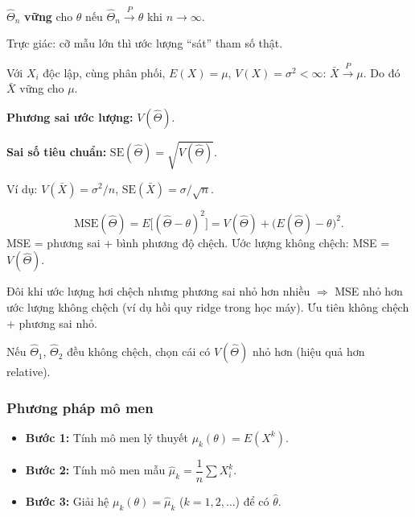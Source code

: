 \documentclass[12pt,a4paper]{article}
\begin{document}
\begin{dinhnghia}[title={Ước lượng vững}]
  $\hat{\Theta}_n$ \textbf{vững} cho $\theta$ nếu $\hat{\Theta}_n \xrightarrow{P} \theta$ khi $n \to \infty$.
  
  Trực giác: cỡ mẫu lớn thì ước lượng ``sát'' tham số thật.
\end{dinhnghia}

\begin{tinhchat}[title={Vững của trung bình mẫu (ĐL lớn số)}]
  Với $X_i$ độc lập, cùng phân phối, $E(X)=\mu$, $V(X)=\sigma^2<\infty$: $\bar{X} \xrightarrow{P} \mu$. Do đó $\bar{X}$ vững cho $\mu$.
\end{tinhchat}

\begin{congthuc}[title={Phương sai và sai số tiêu chuẩn của ước lượng}]
  \textbf{Phương sai ước lượng:} $V(\hat{\Theta})$.
  
  \textbf{Sai số tiêu chuẩn:} $\text{SE}(\hat{\Theta}) = \sqrt{V(\hat{\Theta})}$.
  
  Ví dụ: $V(\bar{X}) = \sigma^2/n$, $\text{SE}(\bar{X}) = \sigma/\sqrt{n}$.
\end{congthuc}

\begin{dinhnghia}[title={Sai số bình phương trung bình - MSE}]
  \[
    \text{MSE}(\hat{\Theta}) = E\bigl[(\hat{\Theta}-\theta)^2\bigr] = V(\hat{\Theta}) + \bigl(E(\hat{\Theta})-\theta\bigr)^2.
  \]
  MSE = phương sai + bình phương độ chệch. Ước lượng không chệch: MSE = $V(\hat{\Theta})$.
\end{dinhnghia}

\begin{ynghia}[title={Đánh đổi chệch-phương sai}]
Đôi khi ước lượng hơi chệch nhưng phương sai nhỏ hơn nhiều $\Rightarrow$ MSE nhỏ hơn ước lượng không chệch (ví dụ hồi quy ridge trong học máy). Ưu tiên không chệch + phương sai nhỏ.
\end{ynghia}

\begin{luuy}[title={So sánh hai ước lượng không chệch}]
Nếu $\hat{\Theta}_1$, $\hat{\Theta}_2$ đều không chệch, chọn cái có $V(\hat{\Theta})$ nhỏ hơn (hiệu quả hơn relative).
\end{luuy}

\subsubsection{Phương pháp mô men}

\begin{phuongphap}[title={Phương pháp mô men (MME)}]
\begin{itemize}
  \item \textbf{Bước 1:} Tính mô men lý thuyết $\mu_k(\theta) = E(X^k)$.
  \item \textbf{Bước 2:} Tính mô men mẫu $\hat{\mu}_k = \dfrac{1}{n}\displaystyle\sum X_i^k$.
  \item \textbf{Bước 3:} Giải hệ $\mu_k(\theta) = \hat{\mu}_k$ ($k=1,2,\ldots$) để có $\hat{\theta}$.
\end{itemize}
\end{phuongphap}
\end{document}
